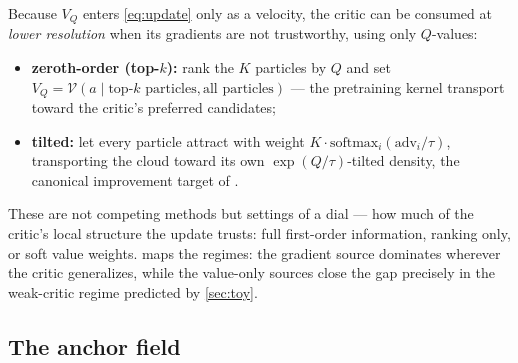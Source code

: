 Because $V_Q$ enters \cref{eq:update} only as a velocity, the critic
can be consumed at \emph{lower resolution} when its gradients are not
trustworthy, using only $Q$-values:
\begin{itemize}
  \item \textbf{zeroth-order (top-$k$):} rank the $K$ particles by
  $Q$ and set $V_Q = \mathcal{V}(a \mid \text{top-}k \text{ particles},
  \text{all particles})$ --- the pretraining kernel transport toward
  the critic's preferred candidates;
  \item \textbf{tilted:} let every particle attract with weight
  $K\cdot\mathrm{softmax}_i(\mathrm{adv}_i/\tau)$, transporting the
  cloud toward its own $\exp(Q/\tau)$-tilted density, the canonical
  improvement target of \citet{peng2019awr,abdolmaleki2018mpo}.
\end{itemize}
These are not competing methods but settings of a dial --- how much of
the critic's local structure the update trusts: full first-order
information, ranking only, or soft value weights. 
maps the regimes: the gradient source dominates wherever the critic
generalizes, while the value-only sources close the gap precisely in
the weak-critic regime predicted by \cref{sec:toy}.

\subsection{The anchor field}
\label{sec:anchor}

